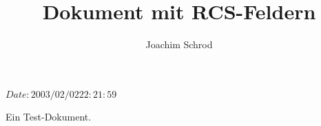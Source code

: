 \documentclass{article}
\begin{document}
\makeatletter
{}

\title{Dokument mit RCS-Feldern}
\author{Joachim Schrod}
\RCSdate $Date: 2003/02/02 22:21:59 $

\maketitle

Ein Test-Dokument.
\end{document}
